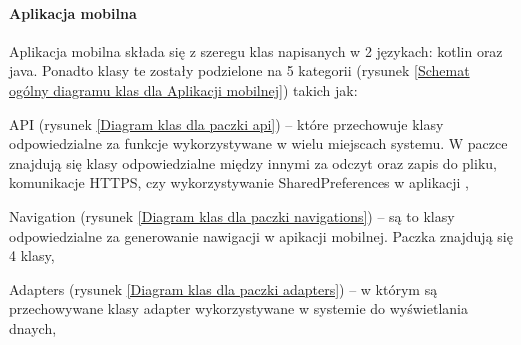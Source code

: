 		\paragraph*{Aplikacja mobilna}
		Aplikacja mobilna składa się z szeregu klas napisanych w 2 językach: kotlin oraz java. Ponadto klasy te 
		zostały podzielone na 5 kategorii 	(rysunek \ref{Schemat ogólny diagramu klas dla Aplikacji mobilnej}) takich jak:
		\begin{itemize*}
			\item API 
			(rysunek \ref{Diagram klas dla paczki api}) 
			--  które przechowuje klasy odpowiedzialne za funkcje wykorzystywane w wielu miejscach systemu. W paczce znajdują się klasy odpowiedzialne między innymi za odczyt oraz zapis do pliku, komunikacje HTTPS, czy wykorzystywanie SharedPreferences w aplikacji ,
			\item Navigation 
			(rysunek \ref{Diagram klas dla paczki navigations}) 
			-- są to klasy odpowiedzialne za generowanie nawigacji w apikacji mobilnej. Paczka znajdują się 4 klasy,
			\item Adapters
			(rysunek \ref{Diagram klas dla paczki adapters}) 
			 -- w którym są przechowywane klasy adapter wykorzystywane w systemie do wyświetlania dnaych,
		\end{itemize*}
	
